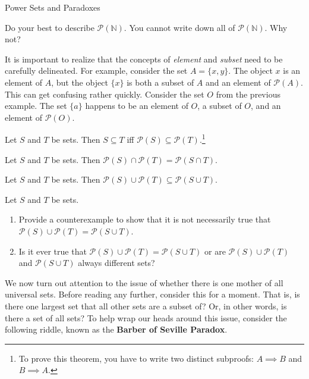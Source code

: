 \begin{section}{Power Sets and Paradoxes}
\begin{exercise}
Do your best to describe $\mathcal{P}(\mathbb{N})$.  You cannot write down all of $\mathcal{P}(\mathbb{N})$.  Why not?
\end{exercise}

\begin{remark}
It is important to realize that the concepts of \emph{element} and \emph{subset} need to be carefully delineated.  For example, consider the set $A=\{x,y\}$.  The object $x$ is an element of $A$, but the object $\{x\}$ is both a subset of $A$ and an element of $\mathcal{P}(A)$.  This can get confusing rather quickly.  Consider the set $O$ from the previous example.  The set $\{a\}$ happens to be an element of $O$, a subset of $O$, and an element of  $\mathcal{P}(O)$.
\end{remark}

\begin{theorem}
Let $S$ and $T$ be sets.  Then $S\subseteq T$ iff $\mathcal{P}(S)\subseteq \mathcal{P}(T)$.\footnote{To prove this theorem, you have to write two distinct subproofs: $A\implies B$ and $B\implies A$.}
\end{theorem}

\begin{theorem}
Let $S$ and $T$ be sets.  Then $\mathcal{P}(S)\cap\mathcal{P}(T)=\mathcal{P}(S\cap T)$.
\end{theorem}

\begin{theorem}
Let $S$ and $T$ be sets.  Then $\mathcal{P}(S)\cup\mathcal{P}(T)\subseteq \mathcal{P}(S\cup T)$.
\end{theorem}


\begin{exercise}
Let $S$ and $T$ be sets.
\begin{enumerate}
\item Provide a counterexample to show that it is not necessarily true that $\mathcal{P}(S)\cup\mathcal{P}(T)= \mathcal{P}(S\cup T)$.
\item Is it ever true that $\mathcal{P}(S)\cup\mathcal{P}(T)= \mathcal{P}(S\cup T)$ or are $\mathcal{P}(S)\cup\mathcal{P}(T)$ and $\mathcal{P}(S\cup T)$ always different sets?
\end{enumerate}
\end{exercise}

We now turn out attention to the issue of whether there is one mother of all universal sets.  Before reading any further, consider this for a moment.  That is, is there one largest set that all other sets are a subset of?  Or, in other words, is there a set of all sets?  To help wrap our heads around this issue, consider the following riddle, known as the \textbf{Barber of Seville Paradox}.


\end{section}
